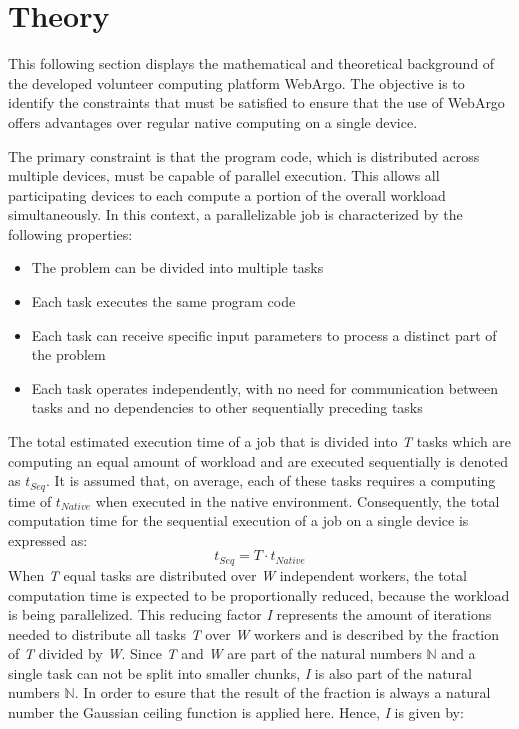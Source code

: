 \section{Theory}
\label{sec:concept:theory}
This following section displays the mathematical and theoretical background of the developed volunteer computing platform WebArgo. The objective is to identify the constraints that must be satisfied to ensure that the use of WebArgo offers advantages over regular native computing on a single device.

The primary constraint is that the program code, which is distributed across multiple devices, must be capable of parallel execution. This allows all participating devices to each compute a portion of the overall workload simultaneously. In this context, a parallelizable job is characterized by the following properties:
\begin{itemize}
  \item The problem can be divided into multiple tasks
  \item Each task executes the same program code
  \item Each task can receive specific input parameters to process a distinct part of the problem
  \item Each task operates independently, with no need for communication between tasks and no dependencies to other sequentially preceding tasks
\end{itemize}
The total estimated execution time of a job that is divided into \emph{T} tasks which are computing an equal amount of workload and are executed sequentially is denoted as $t_{Seq}$. It is assumed that, on average, each of these tasks requires a computing time of $t_{Native}$ when executed in the native environment. Consequently, the total computation time for the sequential execution of a job on a single device is expressed as:
\begin{equation}
  t_{Seq} = T \cdot t_{Native}
  \label{equ:single}
\end{equation}
When \emph{T} equal tasks are distributed over \emph{W} independent workers, the total computation time is expected to be proportionally reduced, because the workload is being parallelized. This reducing factor \emph{I} represents the amount of iterations needed to distribute all tasks \emph{T} over \emph{W} workers and is described by the fraction of \emph{T} divided by \emph{W}. Since \emph{T} and \emph{W} are part of the natural numbers $\mathbb{N}$ and a single task can not be split into smaller chunks, \emph{I} is also part of the natural numbers $\mathbb{N}$. In order to esure that the result of the fraction is always a natural number the Gaussian ceiling function is applied here. Hence, \emph{I} is given by: 
